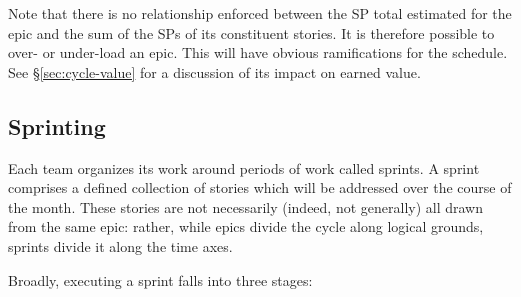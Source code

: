 Note that there is no relationship enforced between the SP total
estimated for the epic and the sum of the SPs of its constituent
stories. It is therefore possible to over- or under-load an epic. This
will have obvious ramifications for the schedule. See \S\ref{sec:cycle-value}
for a discussion of its impact on earned value.

\subsection{Sprinting}
\label{sec:sprinting}

Each team organizes its work around periods of work called sprints. A
sprint comprises a defined collection of stories which will be addressed
over the course of the month. These stories are not necessarily (indeed,
not generally) all drawn from the same epic: rather, while epics divide
the cycle along logical grounds, sprints divide it along the time axes.

Broadly, executing a sprint falls into three stages:

